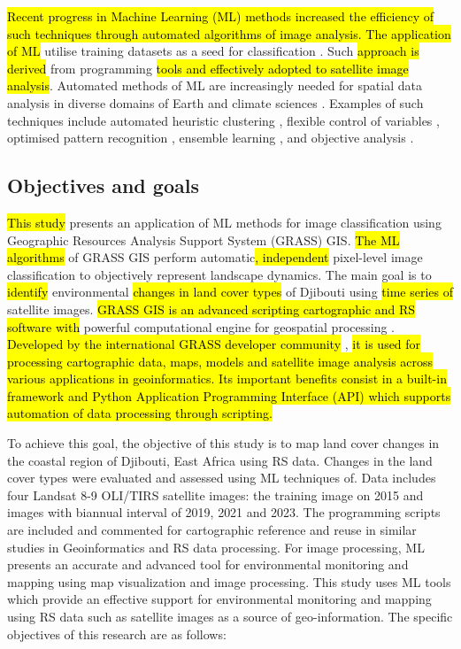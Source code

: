 \documentclass[jimaging,article,submit,pdftex,moreauthors]{Definitions/mdpi}
\begin{document}
 \hl{Recent progress in Machine Learning (ML) methods increased the efficiency of such techniques through automated algorithms of image analysis. The application of ML} utilise training datasets as a seed for classification \cite{FERCHICHI2024122211}. Such \hl{approach is derived} from programming \hl{tools and effectively adopted to satellite image analysis}. Automated methods of ML are increasingly needed for spatial data analysis in diverse domains of Earth and climate sciences \cite{HUANG2020104580,Arabameri}. Examples of such techniques include automated heuristic clustering \cite{8524429,10615674,669164,4666175}, flexible control of variables \cite{8999627}, optimised pattern recognition \cite{9708387,1634653}, ensemble learning \cite{10145147}, and objective analysis \cite{8938484,9279780}. 

\subsection{Objectives and goals}

\hl{This study} presents an application of ML methods for image\hl{ }classification using\hl{ }Geographic Resources Analysis Support System (GRASS) GIS. \hl{The ML algorithms} of GRASS GIS perform\hl{ }automatic\hl{, independent} pixel-level image classification\hl{ }to objectively represent landscape dynamics. The main goal\hl{ }is to\hl{ identify} environmental \hl{ changes in land cover types }of Djibouti using \hl{ time series of }satellite images. \hl{GRASS GIS is an advanced scripting cartographic and RS software with} powerful computational engine for geospatial processing \cite{NETELER2012124}. \hl{Developed by the international GRASS developer community} \cite{grass_development_team_2025_14918754}, \hl{it is used for processing cartographic data, maps, models and satellite image analysis across various applications in geoinformatics. Its important benefits consist in a built-in framework and Python Application Programming Interface (API) which supports automation of data processing through scripting.} 

To achieve this goal, the objective of this study is to map land cover changes in the coastal region of Djibouti, East Africa using RS data. Changes in the land cover types were evaluated and assessed using ML techniques of. Data includes four Landsat 8-9 OLI/TIRS satellite images: the training image on 2015 and images with biannual interval of 2019, 2021 and 2023. The programming scripts are included and commented for cartographic reference and reuse in similar studies in Geoinformatics and RS data processing. For image processing, ML presents an accurate and advanced tool for environmental monitoring and mapping using map visualization and image processing. This study uses ML tools which provide an effective support for environmental monitoring and mapping using RS data such as satellite images as a source of geo-information. The specific objectives of this research are as follows:
\end{document}
